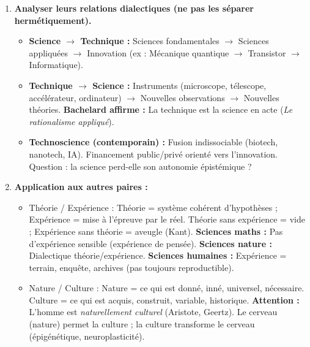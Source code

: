 \documentclass[11pt]{article}
\newcommand{\cle}[1]{{\popxbold\color{popdark}#1}}
\begin{document}
\begin{methode}
\begin{enumerate}
\begin{center}
        \end{center}
        \item \textbf{Analyser leurs relations dialectiques (ne pas les séparer hermétiquement).}
        \begin{itemize}
            \item \textbf{Science $\rightarrow$ Technique :} Sciences fondamentales $\rightarrow$ Sciences appliquées $\rightarrow$ Innovation (ex : Mécanique quantique $\rightarrow$ Transistor $\rightarrow$ Informatique).
            \item \textbf{Technique $\rightarrow$ Science :} Instruments (microscope, télescope, accélérateur, ordinateur) $\rightarrow$ Nouvelles observations $\rightarrow$ Nouvelles théories. \textbf{Bachelard affirme :} \guillemotleft La technique est la science en acte \guillemotright (\emph{Le rationalisme appliqué}).
            \item \textbf{Technoscience (contemporain) :} Fusion indissociable (biotech, nanotech, IA). Financement public/privé orienté vers l'innovation. Question : la science perd-elle son autonomie épistémique ?
        \end{itemize}
        \item \textbf{Application aux autres paires :}
        \begin{itemize}
            \item \cle{Théorie / Expérience} : Théorie = système cohérent d'hypothèses ; Expérience = mise à l'épreuve par le réel. Théorie sans expérience = vide ; Expérience sans théorie = aveugle (Kant). \textbf{Sciences maths :} Pas d'expérience sensible (expérience de pensée). \textbf{Sciences nature :} Dialectique théorie/expérience. \textbf{Sciences humaines :} Expérience = terrain, enquête, archives (pas toujours reproductible).
            \item \cle{Nature / Culture} : Nature = ce qui est donné, inné, universel, nécessaire. Culture = ce qui est acquis, construit, variable, historique. \textbf{Attention :} L'homme est \emph{naturellement culturel} (Aristote, Geertz). Le cerveau (nature) permet la culture ; la culture transforme le cerveau (épigénétique, neuroplasticité).
        \end{itemize}
    \end{enumerate}
\end{methode}
\end{document}
